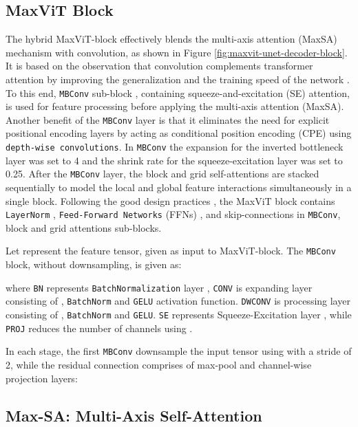 \documentclass{article}
\begin{document}
\subsection{MaxViT Block}\label{MaxViT Block}

The hybrid MaxViT-block effectively blends the multi-axis attention (MaxSA) mechanism with convolution, as shown in Figure \ref{fig:maxvit-unet-decoder-block}. It is based on the observation that convolution complements transformer attention by improving the generalization and the training speed of the network \cite{xiao2021early}. To this end, \texttt{MBConv} sub-block \cite{sandler2018mobilenetv2}, containing squeeze-and-excitation (SE) \cite{hu2018squeeze} attention, is used for feature processing before applying the multi-axis attention (MaxSA). Another benefit of the \texttt{MBConv} layer is that it eliminates the need for explicit positional encoding layers by acting as conditional position encoding (CPE) \cite{chu2023conditional} using \texttt{depth-wise convolutions}. In \texttt{MBConv} the expansion for the inverted bottleneck layer was set to 4 and the shrink rate for the squeeze-excitation layer was set to 0.25. After the \texttt{MBConv} layer, the block and grid self-attentions are stacked sequentially to model the local and global feature interactions simultaneously in a single block. Following the good design practices \cite{dosovitskiy2021an,cao2022swin}, the MaxViT block contains \texttt{LayerNorm} \cite{ba2016layer}, \texttt{Feed-Forward Networks} (FFNs) \cite{dosovitskiy2021an,cao2022swin}, and skip-connections in \texttt{MBConv}, block and grid attentions sub-blocks.

Let  represent the feature tensor, given as input to MaxViT-block. The \texttt{MBConv} block, without downsampling, is given as:


where \texttt{BN} represents \texttt{BatchNormalization} layer \cite{ioffe2015batch}, \texttt{CONV} is expanding layer consisting of , \texttt{BatchNorm} and \texttt{GELU} \cite{hendrycks2016gaussian} activation function. \texttt{DWCONV} is processing layer consisting of , \texttt{BatchNorm} and \texttt{GELU}. \texttt{SE} represents Squeeze-Excitation layer \cite{hu2018squeeze}, while \texttt{PROJ} reduces the number of channels using .

In each stage, the first \texttt{MBConv} downsample the input tensor  using  with a stride of 2, while the residual connection comprises of max-pool and channel-wise projection layers:


\subsection{Max-SA: Multi-Axis Self-Attention}\label{Max-SA: Multi-Axis Self-Attention}
\end{document}

